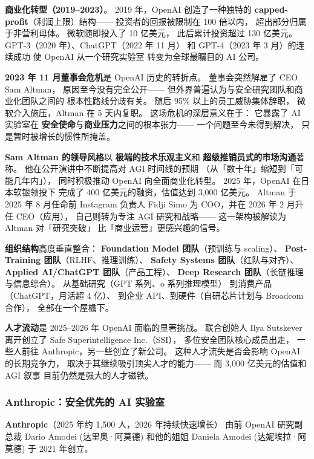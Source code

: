\textbf{商业化转型（2019--2023）}。
2019 年，OpenAI 创造了一种独特的
\textbf{capped-profit}（利润上限）结构——
投资者的回报被限制在 100 倍以内，
超出部分归属于非营利母体。
微软随即投入了 10 亿美元，
此后累计投资超过 130 亿美元。
GPT-3（2020 年）、ChatGPT（2022 年 11 月）
和 GPT-4（2023 年 3 月）的连续成功
使 OpenAI 从一个研究实验室
转变为全球最瞩目的 AI 公司。

\textbf{2023 年 11 月董事会危机}是 OpenAI 历史的转折点。
董事会突然解雇了 CEO Sam Altman，
原因至今没有完全公开——
但外界普遍认为与安全研究团队和商业化团队之间的
根本性路线分歧有关。
随后 95\% 以上的员工威胁集体辞职，
微软介入施压，Altman 在 5 天内复职。
这场危机的深层意义在于：
它暴露了 AI 实验室在
\textbf{安全使命}与\textbf{商业压力}之间的根本张力——
一个问题至今未得到解决，
只是暂时被增长的惯性所掩盖。

\textbf{Sam Altman 的领导风格}以
\textbf{极端的技术乐观主义}和
\textbf{超级推销员式的市场沟通}著称。
他在公开演讲中不断提高对 AGI 时间线的预期
（从「数十年」缩短到「可能几年内」），
同时积极推动 OpenAI 向全面商业化转型。
2025 年，OpenAI 在日本软银领投下
完成了 400 亿美元的融资，估值达到 3,000 亿美元。
Altman 于 2025 年 8 月任命前 Instagram 负责人
Fidji Simo 为 COO，并在 2026 年 2 月升任 CEO（应用），
自己则转为专注 AGI 研究和战略——
这一架构被解读为 Altman 对「研究突破」
比「商业运营」更感兴趣的信号。

\textbf{组织结构}高度垂直整合：
\textbf{Foundation Model 团队}（预训练与 scaling）、
\textbf{Post-Training 团队}（RLHF、推理训练）、
\textbf{Safety Systems 团队}（红队与对齐）、
\textbf{Applied AI/ChatGPT 团队}（产品工程）、
\textbf{Deep Research 团队}（长链推理与信息综合）。
从基础研究（GPT 系列、o 系列推理模型）
到消费产品（ChatGPT，月活超 4 亿）、
到企业 API、到硬件（自研芯片计划与 Broadcom 合作），
全部在一个屋檐下。

\textbf{人才流动}是 2025--2026 年 OpenAI 面临的显著挑战。
联合创始人 Ilya Sutskever 离开创立了
Safe Superintelligence Inc.（SSI），
多位安全团队核心成员出走，
一些人前往 Anthropic，另一些创立了新公司。
这种人才流失是否会影响 OpenAI 的长期竞争力，
取决于其继续吸引顶尖人才的能力——
而 3,000 亿美元的估值和 AGI 叙事
目前仍然是强大的人才磁铁。

\subsubsection{Anthropic：安全优先的 AI 实验室}

\textbf{Anthropic}（2025 年约 1,500 人，2026 年持续快速增长）
由前 OpenAI 研究副总裁 Dario Amodei (达里奥·阿莫德)
和他的姐姐 Daniela Amodei (达妮埃拉·阿莫德)
于 2021 年创立。

